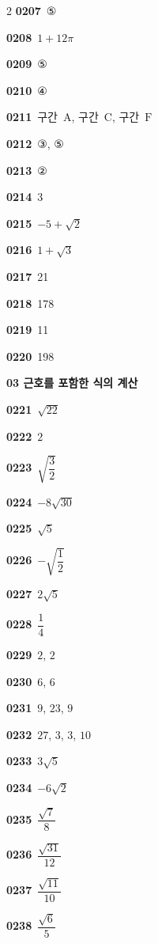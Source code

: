 \documentclass[10pt,a4paper]{article}
\newcommand{\pt}[1]{\mathrm{#1}}
\begin{document}
\begin{multicols}{2}
\noindent\textbf{0207}\ ⑤\par
\noindent\textbf{0208}\ $1+12\pi$\par
\noindent\textbf{0209}\ ⑤\par
\noindent\textbf{0210}\ ④\par
\noindent\textbf{0211}\ 구간~$\pt{A}$, 구간~$\pt{C}$, 구간~$\pt{F}$\par
\noindent\textbf{0212}\ ③, ⑤\par
\noindent\textbf{0213}\ ②\par
\noindent\textbf{0214}\ 3\par
\noindent\textbf{0215}\ $-5+\sqrt{2}$\par
\noindent\textbf{0216}\ $1+\sqrt{3}$\par
\noindent\textbf{0217}\ 21\par
\noindent\textbf{0218}\ 178\par
\noindent\textbf{0219}\ 11\par
\noindent\textbf{0220}\ 198\par
\noindent\textbf{03 근호를 포함한 식의 계산}\par\smallskip
\noindent\textbf{0221}\ $\sqrt{22}$\par
\noindent\textbf{0222}\ $2$\par
\noindent\textbf{0223}\ $\sqrt{\dfrac{3}{2}}$\par
\noindent\textbf{0224}\ $-8\sqrt{30}$\par
\noindent\textbf{0225}\ $\sqrt{5}$\par
\noindent\textbf{0226}\ $-\sqrt{\dfrac{1}{2}}$\par
\noindent\textbf{0227}\ $2\sqrt{5}$\par
\noindent\textbf{0228}\ $\dfrac{1}{4}$\par
\noindent\textbf{0229}\ $2$, $2$\par
\noindent\textbf{0230}\ $6$, $6$\par
\noindent\textbf{0231}\ $9$, $23$, $9$\par
\noindent\textbf{0232}\ $27$, $3$, $3$, $10$\par
\noindent\textbf{0233}\ $3\sqrt{5}$\par
\noindent\textbf{0234}\ $-6\sqrt{2}$\par
\noindent\textbf{0235}\ $\dfrac{\sqrt{7}}{8}$\par
\noindent\textbf{0236}\ $\dfrac{\sqrt{31}}{12}$\par
\noindent\textbf{0237}\ $\dfrac{\sqrt{11}}{10}$\par
\noindent\textbf{0238}\ $\dfrac{\sqrt{6}}{5}$\par

\end{multicols}
\end{document}
